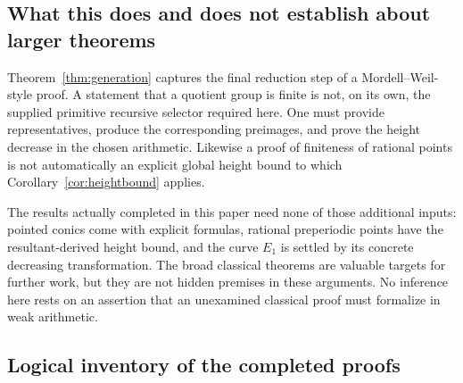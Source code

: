 \subsection{What this does and does not establish about larger theorems}

Theorem~\ref{thm:generation} captures the final reduction step of a
Mordell--Weil-style proof. A statement that a quotient group is finite is
not, on its own, the supplied primitive recursive selector required here.
One must provide representatives, produce the corresponding preimages,
and prove the height decrease in the chosen arithmetic. Likewise a proof
of finiteness of rational points is not automatically an explicit global
height bound to which Corollary~\ref{cor:heightbound} applies.

The results actually completed in this paper need none of those additional
inputs: pointed conics come with explicit formulas, rational preperiodic
points have the resultant-derived height bound, and the curve $E_1$ is
settled by its concrete decreasing transformation. The broad classical
theorems are valuable targets for further work, but they are not hidden
premises in these arguments. No inference here rests on an assertion that
an unexamined classical proof must formalize in weak arithmetic.

\subsection{Logical inventory of the completed proofs}

